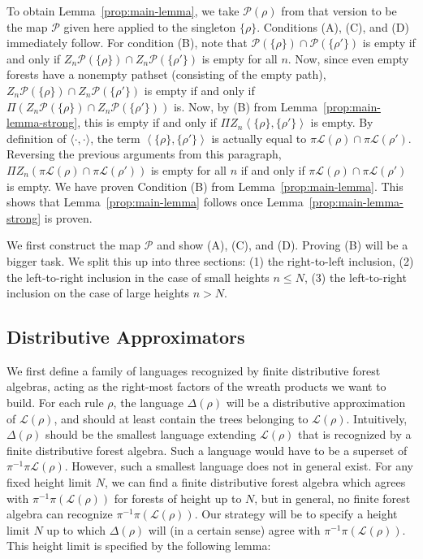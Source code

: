 \documentclass[sigplan,9pt]{acmart}\settopmatter{printfolios=true,printccs=false,printacmref=false}
\theoremstyle{definition}
\newcommand{\La}[0]{{\mathcal{L}}}
\newcommand{\Pa}[0]{{\mathcal{P}}}
\newcommand{\Rn}[0]{Z_n}
\begin{document}
To obtain Lemma~\ref{prop:main-lemma}, we take $\Pa(\rho)$ from that version to be the map $\Pa$ given here applied to the singleton $\{\rho\}$. 
Conditions (A), (C), and (D) immediately follow.
For condition (B), note that $\Pa(\{\rho\}) \cap \Pa(\{\rho'\})$ is empty if and only if $\Rn\Pa(\{\rho\}) \cap \Rn\Pa(\{\rho'\})$ is empty for all $n$.
Now, since even empty forests have a nonempty pathset (consisting of the empty path), $\Rn\Pa(\{\rho\}) \cap \Rn\Pa(\{\rho'\})$ is empty if and only if $\Pi(\Rn\Pa(\{\rho\}) \cap \Rn\Pa(\{\rho'\}))$ is.
Now, by (B) from Lemma~\ref{prop:main-lemma-strong}, this is empty if and only if $\Pi \Rn \left\langle\{\rho\}, \{\rho'\}\right\rangle$ is empty.
By definition of $\langle\cdot,\cdot\rangle$, the term $\left\langle\{\rho\}, \{\rho'\}\right\rangle$ is actually equal to $\pi\La(\rho) \cap \pi\La(\rho')$.
Reversing the previous arguments from this paragraph, $\Pi \Rn (\pi\La(\rho) \cap \pi\La(\rho'))$ is empty for all $n$ if and only if $\pi\La(\rho) \cap \pi\La(\rho')$ is empty.
We have proven Condition (B) from Lemma~\ref{prop:main-lemma}.
This shows that Lemma~\ref{prop:main-lemma} follows once Lemma~\ref{prop:main-lemma-strong} is proven.


We first construct the map $\Pa$ and show (A), (C), and (D).
Proving (B) will be a bigger task.
We split this up into three sections: (1) the right-to-left inclusion, (2) the left-to-right inclusion in the case of small heights $n \leq N$, (3) the left-to-right inclusion on the case of large heights $n > N$.


\subsection{Distributive Approximators}


We first define a family of languages recognized by finite distributive forest algebras, acting as the right-most factors of the wreath products we want to build.
For each rule $\rho$, the language $\Delta(\rho)$ will be a distributive approximation of $\La(\rho)$, and should at least contain the trees belonging to $\La(\rho)$.
Intuitively, $\Delta(\rho)$ should be  the smallest language extending $\La(\rho)$ that is recognized by a finite distributive forest algebra.
Such a language would have to be a superset of $\pi^{-1}\pi\La(\rho)$.
However, such a smallest language does not in general exist.
For any fixed height limit $N$, we can find a finite distributive forest algebra which agrees with $\pi^{-1}\pi(\La(\rho))$ for forests of height up to $N$, but in general, no finite forest algebra can recognize $\pi^{-1}\pi(\La(\rho))$.
Our strategy will be to specify a height limit $N$ up to which $\Delta(\rho)$ will (in a certain sense) agree with $\pi^{-1}\pi(\La(\rho))$.
This height limit is specified by the following lemma:
\end{document}
